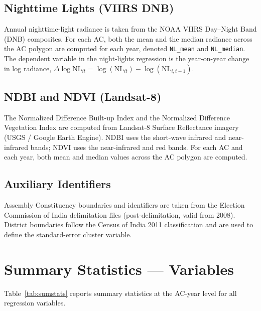 \documentclass[12pt,a4paper,oneside]{report}
\begin{document}
\subsection{Nighttime Lights (VIIRS DNB)}
Annual nighttime-light radiance is taken from the NOAA VIIRS Day--Night Band (DNB) composites. For each AC, both the mean and the median radiance across the AC polygon are computed for each year, denoted \texttt{NL\_mean} and \texttt{NL\_median}. The dependent variable in the night-lights regression is the year-on-year change in log radiance, $\Delta \log \text{NL}_{it} = \log(\text{NL}_{it}) - \log(\text{NL}_{i,t-1})$.

\subsection{NDBI and NDVI (Landsat-8)}
The Normalized Difference Built-up Index and the Normalized Difference Vegetation Index are computed from Landsat-8 Surface Reflectance imagery (USGS / Google Earth Engine). NDBI uses the short-wave infrared and near-infrared bands; NDVI uses the near-infrared and red bands. For each AC and each year, both mean and median values across the AC polygon are computed.

\subsection{Auxiliary Identifiers}
Assembly Constituency boundaries and identifiers are taken from the Election Commission of India delimitation files (post-delimitation, valid from 2008). District boundaries follow the Census of India 2011 classification and are used to define the standard-error cluster variable.

\section{Summary Statistics --- Variables}
Table~\ref{tab:sumstats} reports summary statistics at the AC-year level for all regression variables.
\end{document}
